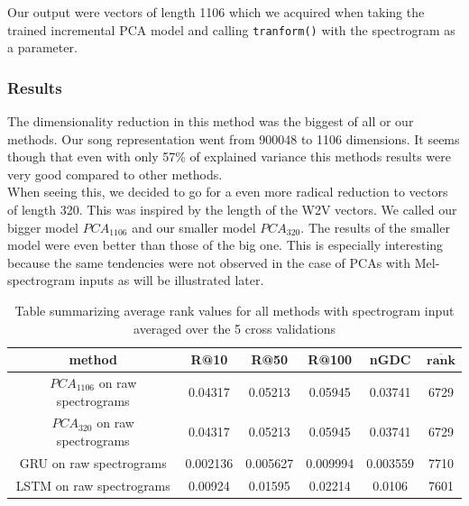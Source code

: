 Our output were vectors of length 1106 which we acquired when taking the trained incremental PCA model and calling \texttt{tranform()} with the spectrogram as a parameter.

\subsubsection{Results}
The dimensionality reduction in this method was the biggest of all or our methods. Our song representation went from 900048 to 1106 dimensions. It seems though that even with only 57\% of explained variance this methods results were very good compared to other methods. \\
When seeing this, we decided to go for a even more radical reduction to vectors of length 320. This was inspired by the length of the W2V vectors. We called our bigger model $PCA_{1106}$ and our smaller model $PCA_{320}. $ The results of the smaller model were even better than those of the big one. This is especially interesting because the same tendencies were not observed in the case of PCAs with Mel-spectrogram inputs as will be illustrated later.
\begin{table}[h!]
\centering
\renewcommand{\arraystretch}{1.5}
\begin{tabu} to 1\textwidth { | c || c | c | c | c | c |}
 \hline
 \textbf{method} & \textbf{R@10} & \textbf{R@50} & \textbf{R@100} & \textbf{nGDC} & $ \boldsymbol{\overline{rank}} $ \\
 \hline
 \hline
 $PCA_{1106}$ on raw spectrograms & 0.04317 & 0.05213 &  0.05945 & 0.03741 & 6729 \\
 \hline
 $PCA_{320}$ on raw spectrograms & 0.04317 & 0.05213 &  0.05945 & 0.03741 & 6729 \\
 \hline
 GRU on raw spectrograms & 0.002136 & 0.005627 & 0.009994 & 0.003559 & 7710 \\
 \hline
 LSTM on raw spectrograms & 0.00924 & 0.01595 & 0.02214 & 0.0106 & 7601\\
 \hline
\end{tabu} \\
\caption{Table summarizing average rank values for all methods with spectrogram input averaged over the 5 cross validations}
\label{table:spec_methods}
\end{table}



